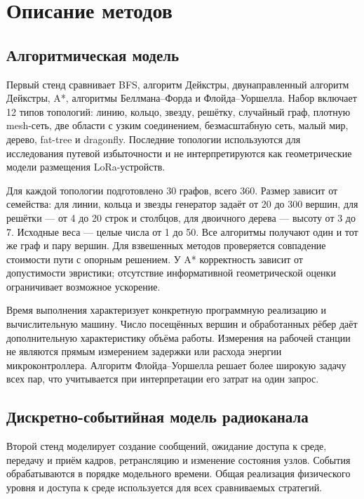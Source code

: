 \section{Описание методов}

\subsection{Алгоритмическая модель}

Первый стенд сравнивает BFS, алгоритм Дейкстры, двунаправленный алгоритм Дейкстры, A*, алгоритмы Беллмана--Форда и Флойда--Уоршелла. Набор включает 12 типов топологий: линию, кольцо, звезду, решётку, случайный граф, плотную mesh-сеть, две области с узким соединением, безмасштабную сеть, малый мир, дерево, fat-tree и dragonfly. Последние топологии используются для исследования путевой избыточности и не интерпретируются как геометрические модели размещения LoRa-устройств.

Для каждой топологии подготовлено 30 графов, всего 360. Размер зависит от семейства: для линии, кольца и звезды генератор задаёт от 20 до 300 вершин, для решётки --- от 4 до 20 строк и столбцов, для двоичного дерева --- высоту от 3 до 7. Исходные веса --- целые числа от 1 до 50. Все алгоритмы получают один и тот же граф и пару вершин. Для взвешенных методов проверяется совпадение стоимости пути с опорным решением. У A* корректность зависит от допустимости эвристики; отсутствие информативной геометрической оценки ограничивает возможное ускорение.

Время выполнения характеризует конкретную программную реализацию и вычислительную машину. Число посещённых вершин и обработанных рёбер даёт дополнительную характеристику объёма работы. Измерения на рабочей станции не являются прямым измерением задержки или расхода энергии микроконтроллера. Алгоритм Флойда--Уоршелла решает более широкую задачу всех пар, что учитывается при интерпретации его затрат на один запрос.

\subsection{Дискретно-событийная модель радиоканала}

Второй стенд моделирует создание сообщений, ожидание доступа к среде, передачу и приём кадров, ретрансляцию и изменение состояния узлов. События обрабатываются в порядке модельного времени. Общая реализация физического уровня и доступа к среде используется для всех сравниваемых стратегий.

